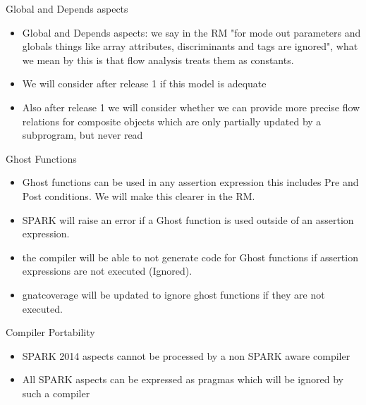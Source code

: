 \documentclass{beamer}
\begin{document}
\begin{frame}{Global and Depends aspects}

  \begin{itemize}

  \item Global and Depends aspects: we say in the RM "for mode out
    parameters and globals things like array attributes,
    discriminants and tags are ignored", what we mean by this is
    that flow analysis treats them as constants.
  \item We will consider after release 1 if this model is adequate
  \item Also after release 1 we will consider whether we can provide more
  precise flow relations for composite objects which are only
  partially updated by a subprogram, but never read
  \end{itemize}

\end{frame}

\begin{frame}{Ghost Functions}

  \begin{itemize}

  \item Ghost functions can be used in any assertion expression this
    includes Pre and Post conditions.  We will make this clearer in the
    RM.
  \item SPARK will raise an error if a Ghost
    function is used outside of an assertion expression.  
  \item the compiler will be able to not generate
    code for Ghost functions if assertion expressions are not executed
    (Ignored).
  \item gnatcoverage will be updated to ignore ghost functions if
    they are not executed.
 \end{itemize}

\end{frame}

\begin{frame}{Compiler Portability}

  \begin{itemize}

  \item SPARK 2014 aspects cannot be processed by a non SPARK aware compiler  
  \item All SPARK aspects can be expressed as pragmas which will be
    ignored by such a compiler
 \end{itemize}

\end{frame}
\end{document}
